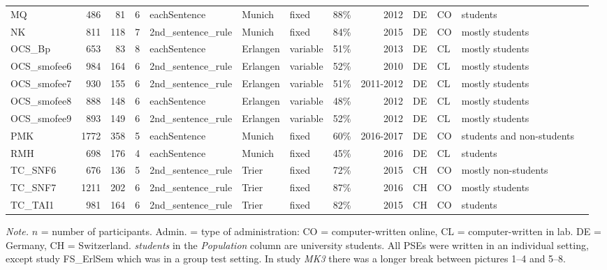 \documentclass[jou,a4paper]{apa6}\usepackage[]{graphicx}\usepackage[]{color}
\begin{document}
\begin{table}
\begin{threeparttable}
\begin{tabularx}{\textwidth}{lrrrlllrrllll}
  MQ & 486 &  81 &   6 & eachSentence & Munich & fixed & 88\% & 2012 & DE & CO & students \\ 
  NK & 811 & 118 &   7 & 2nd\_sentence\_rule & Munich & fixed & 84\% & 2015 & DE & CO & mostly students \\ 
  OCS\_Bp & 653 &  83 &   8 & eachSentence & Erlangen & variable & 51\% & 2013 & DE & CL & mostly students \\ 
  OCS\_smofee6 & 984 & 164 &   6 & 2nd\_sentence\_rule & Erlangen & variable & 52\% & 2010 & DE & CL & mostly students \\ 
  OCS\_smofee7 & 930 & 155 &   6 & 2nd\_sentence\_rule & Erlangen & variable & 51\% & 2011-2012 & DE & CL & mostly students \\ 
  OCS\_smofee8 & 888 & 148 &   6 & eachSentence & Erlangen & variable & 48\% & 2012 & DE & CL & mostly students \\ 
  OCS\_smofee9 & 893 & 149 &   6 & 2nd\_sentence\_rule & Erlangen & variable & 52\% & 2012 & DE & CL & mostly students \\ 
  PMK & 1772 & 358 &   5 & eachSentence & Munich & fixed & 60\% & 2016-2017 & DE & CO & students and non-students \\ 
  RMH & 698 & 176 &   4 & eachSentence & Munich & fixed & 45\% & 2016 & DE & CL & students \\ 
  TC\_SNF6 & 676 & 136 &   5 & 2nd\_sentence\_rule & Trier & fixed & 72\% & 2015 & CH & CO & mostly non-students \\ 
  TC\_SNF7 & 1211 & 202 &   6 & 2nd\_sentence\_rule & Trier & fixed & 87\% & 2016 & CH & CO & mostly students \\ 
  TC\_TAI1 & 981 & 164 &   6 & 2nd\_sentence\_rule & Trier & fixed & 82\% & 2015 & CH & CO & students \\ 
   \hline


		\bottomrule
		\end{tabularx}
		\begin{tablenotes}[para,flushleft]
			{\small
			\vspace*{0.75em}
			\textit{Note.} $n$ = number of participants. Admin. = type of administration: CO = computer-written online, CL = computer-written in lab. DE = Germany, CH = Switzerland.  \emph{students} in the \emph{Population} column are university students. All PSEs were written in an individual setting, except study FS\_ErlSem which was in a group test setting. In study \emph{MK3} there was a longer break between pictures 1--4 and 5--8.}
    \end{tablenotes}
\end{threeparttable}
\end{table}
\end{document}

